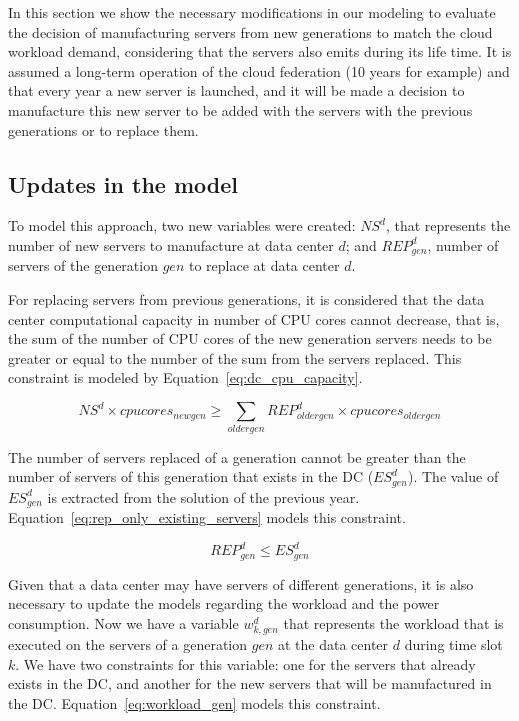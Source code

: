 In this section we show the necessary modifications in our modeling to evaluate the decision of manufacturing servers from new generations to match the cloud workload demand, considering that the servers also emits  during its life time. It is assumed a long-term operation of the cloud federation (10 years for example) and that every year a new server is launched, and it will be made a decision to manufacture this new server to be added with the servers with the previous generations or to replace them.

\subsection{Updates in the model}

To model this approach, two new variables were created: $NS^d$, that represents the number of new servers to manufacture at data center $d$; and $REP_{gen}^d$, number of servers of the generation $gen$ to replace at data center $d$.

For replacing servers from previous generations, it is considered that the data center computational capacity in number of CPU cores cannot decrease, that is, the sum of the number of CPU cores of the new generation servers needs to be greater or equal to the number of the sum from the servers replaced. This constraint is modeled by Equation~\eqref{eq:dc_cpu_capacity}.

\begin{equation} \label{eq:dc_cpu_capacity}
 NS^d \times cpucores_{newgen} \geq \sum_{oldergen}  REP_{oldergen}^d \times cpucores_{oldergen}
\end{equation}

The number of servers replaced of a generation cannot be greater than the number of servers of this generation that exists in the DC ($ES_{gen}^d $). The value of  $ES_{gen}^d $ is extracted from the solution of the previous year. Equation~\eqref{eq:rep_only_existing_servers} models this constraint.

\begin{equation} \label{eq:rep_only_existing_servers}
 REP_{gen}^d \leq ES_{gen}^d 
\end{equation}


Given that a data center may have servers of different generations, it is also necessary to update the models regarding the workload and the power consumption. Now we have a variable $w_{k,gen}^d$ that represents the workload that is executed on the servers of a generation $gen$ at the data center $d$ during time slot $k$. We have two constraints for this variable: one for the servers that already exists in the DC, and another for the new servers that will be manufactured in the DC. Equation~\eqref{eq:workload_gen} models this constraint.



